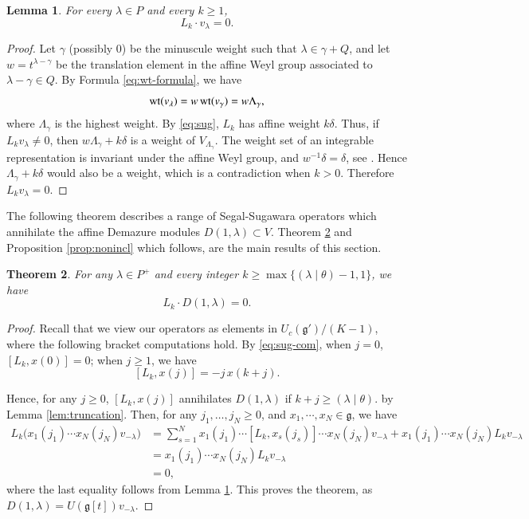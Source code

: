 \documentclass[a4paper, 12pt]{amsart}
\newtheorem{theorem}{Theorem}[section]
\newtheorem{lemma}[theorem]{Lemma}
\theoremstyle{definition}
\newcommand{\g}{\mathfrak g}
\begin{document}
\begin{lemma}
\label{lem:primary}
For every $\lambda\in P$ and every $k\geq 1$,
\begin{equation}
L_k\cdot  v_\lambda=0.
\label{eq:positive-lattice}
\end{equation}
\end{lemma}
\begin{proof}
Let $\gamma$ (possibly $0$) be the minuscule weight such that $\lambda\in\gamma+Q$,
and let $w=t^{\lambda-\gamma}$ be the translation element in the affine Weyl group  associated to
$\lambda-\gamma\in Q$. By Formula \eqref{eq:wt-formula}, we have
$${\rm wt}(v_\lambda)=w\,{\rm wt}(v_\gamma)=w\Lambda_{\gamma},$$
 where $\Lambda_\gamma$ is the highest weight.
By \eqref{eq:sug}, $L_k$ has affine weight $k\delta$. Thus, if
$L_kv_\lambda\neq0$, then $w\Lambda_\gamma+k\delta$ is a weight of
$V_{\Lambda_\gamma}$. The weight set of an integrable representation is
invariant under the affine Weyl group, and $w^{-1}\delta=\delta$, see \cite[\S 6.5]{Kac}.
Hence $\Lambda_\gamma+k\delta$ would also be a weight, which is a contradiction when $k>0$. Therefore $L_kv_\lambda=0$.
\end{proof}

The following theorem describes a range of Segal-Sugawara operators which annihilate the affine Demazure modules $D(1, \lambda) \subset V$. Theorem \ref{thm:vir-bound} and Proposition \ref{prop:nonincl} which follows, are the main results of this section.
 
\begin{theorem}
\label{thm:vir-bound}
For any $\lambda\in P^+$ and  every integer $k\geq \max \{ (\lambda\mid \theta) -1, 1\}$,  we have 
\begin{equation}
L_k \cdot D(1,\lambda)=0.
\label{eq:vir-annihilation}
\end{equation}
\end{theorem}
\begin{proof}

Recall that we view our operators as elements in $U_c(\mathfrak{g}')/(K-1)$, where the following bracket computations hold. By \eqref{eq:sug-com}, when $j=0$,  $[L_k,x(0)]=0$; when $j\geq1$, we have
\[[L_k,x(j)]=-j\,x(k+j). \]

Hence, for any $j\geq 0$, $[L_k,x(j)]$ annihilates $D(1,\lambda)$ if $k+j\geq (\lambda\mid \theta) .$ by Lemma \ref{lem:truncation}. Then,  for any $ j_1,\ldots,j_N\geq0$, and $x_1, \cdots, x_{N}\in \g$,  we have
\begin{align*}
L_k \big (x_1(j_1)\cdots x_N(j_N)v_{-\lambda}   \big ) &=\sum_{s=1 }^N  x_1(j_1)  \cdots [L_k, x_s(j_s)]  \cdots x_N(j_N) v_{-\lambda} + x_1(j_1)\cdots x_N(j_N) L_k v_{-\lambda}   \\
&=x_1(j_1)\cdots x_N(j_N) L_k v_{-\lambda}  \\
&=0,
\end{align*}
where the last equality follows from Lemma \ref{lem:primary}. 
This proves the theorem, as $D(1, \lambda)= U(\g[t])v_{-\lambda}$. 
\end{proof}
\end{document}
